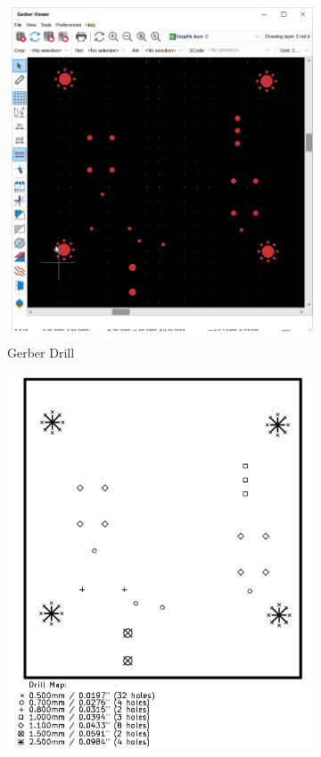 \documentclass[12pt]{book}
\begin{document}
	\begin{figure}[!ht]
		\centering
		\begin{subfigure}[t]{0.4\textwidth}
			\includegraphics[width=\textwidth]{images/fab/fab_8}
			\caption{Gerber Drill}
		\end{subfigure}
		\begin{subfigure}[t]{0.4\textwidth}
			\includegraphics[width=\textwidth]{images/fab/fab_9}

\end{subfigure}
\end{figure}
\end{document}
